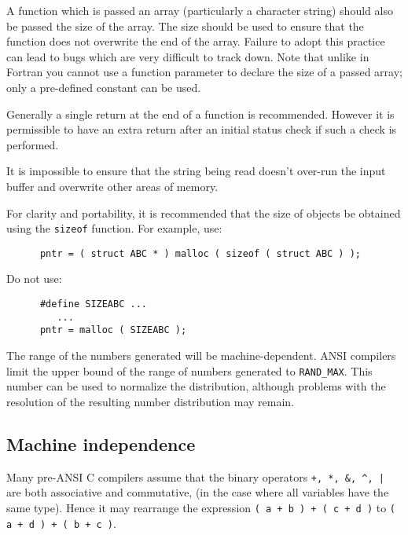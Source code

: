 A function which is passed an array (particularly a 
character string) should also be passed the size of the array.
The size should be used to ensure that the function does not overwrite the 
end of the array.
Failure to adopt this practice can lead to bugs which are very difficult to 
track down.  Note that unlike in Fortran you cannot use a function parameter 
to declare the size of a passed array; only a pre-defined constant can be used.


Generally a single return at the end of a function is recommended.
However it is permissible to have an extra return after 
an initial status check if such a check is performed.


It is impossible to ensure that the string being
read doesn't over-run the input buffer and overwrite other areas of memory.

For clarity and portability, it is recommended that the size of objects be
obtained using the \verb~sizeof~ function.
For example, use:
\begin{verbatim}
      pntr = ( struct ABC * ) malloc ( sizeof ( struct ABC ) );
\end{verbatim}

Do not use:
\begin{verbatim}
      #define SIZEABC ...
         ...
      pntr = malloc ( SIZEABC );
\end{verbatim}


The range of the numbers generated will be machine-dependent.
ANSI compilers limit the upper bound of the range of numbers generated to 
{\tt RAND\_MAX}. 
This number can be used to normalize the distribution, although
problems with the resolution of the resulting number distribution may remain.


\subsection{Machine independence}


Many pre-ANSI C compilers assume that the binary operators 
\verb~+, *, &, ^, |~
are both associative and commutative, (in the case where all variables have 
the same type).
Hence it may rearrange the expression
{\tt ( a + b ) + ( c + d )} to {\tt ( a + d ) + ( b + c )}.

